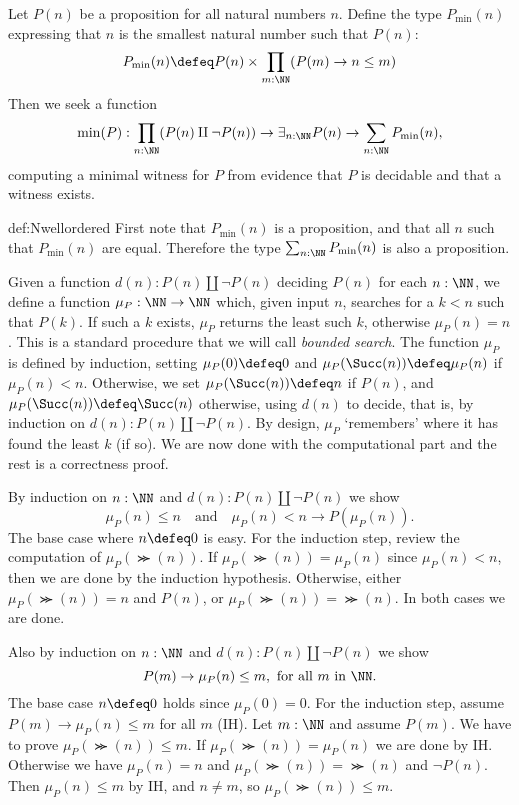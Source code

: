 \begin{construction}
\label{def:Nwellordered}
Let $P(n)$ be a proposition for all natural numbers $n$.
Define the type $P_{\min}(n)$ expressing that $n$ is the smallest
natural number such that $P(n)$:
\[
P_{\min}(n) \defeq P(n) \times \prod_{m:\NN} (P(m) \to n\leq m)
\]
Then we seek a function
\begin{equation}\label{eqn:min}
\min(P) : \prod_{n:\NN}(P(n)\amalg\neg P(n)) \to
          \exists_{n:\NN} P(n) \to \sum_{n:\NN} P_{\min}(n),
\end{equation}
computing a minimal witness for $P$
from evidence that $P$ is decidable and that a witness exists.
\end{construction}
\begin{implementation}{def:Nwellordered}
First note that $P_{\min}(n)$ is a proposition,
and that all $n$ such that $P_{\min}(n)$
are equal. Therefore the type $\sum_{n:\NN} P_{\min}(n)$
is also a proposition.

Given a function $d(n): P(n)\amalg\neg P(n)$ deciding $P(n)$ for each $n:\NN$,
we define a function $\mu_P:\NN\to\NN$ which,
given input $n$, searches for a $k<n$ such that $P(k)$.
If such a $k$ exists, $\mu_P$ returns the least such $k$,
otherwise $\mu_P(n) = n$.
This is a standard procedure that we will call \emph{bounded search}.
The function $\mu_P$ is defined by induction, setting
$\mu_P(0)\defeq 0$ and
$\mu_P(\Succ(n))\defeq \mu_P(n)$ if $\mu_P(n) < n$.
Otherwise, we set $\mu_P(\Succ(n))\defeq n$ if $P(n)$,
and $\mu_P(\Succ(n))\defeq \Succ(n)$ otherwise, using $d(n)$ to decide,
that is, by induction on $d(n):P(n)\amalg\neg P(n)$.
By design, $\mu_P$ `remembers' where it has found the least $k$ (if so).
We are now done with the computational part and the rest
is a correctness proof.

By induction on $n:\NN$ and $d(n): P(n)\amalg\neg P(n)$ we show
\[
\mu_P(n)\leq n \quad\text{and}\quad \mu_P(n)<n \to P(\mu_P(n)).
\]
The base case where $n \defeq 0$ is easy. For the induction step,
review the computation of $\mu_P(\Succ(n))$. If $\mu_P(\Succ(n)) = \mu_P(n)$
since $\mu_P(n) < n$, then we are done by the induction hypothesis.
Otherwise, either $\mu_P(\Succ(n)) = n$ and $P(n)$, or $\mu_P(\Succ(n)) = \Succ(n)$.
In both cases we are done.

Also by induction on $n:\NN$ and $d(n): P(n)\amalg\neg P(n)$ we show
\[
P(m) \to \mu_P(n)\leq m,~ \text{for all $m$ in $\NN$.}
\]
The base case $n \defeq 0$ holds since $\mu_P(0) = 0$. For the induction step,
assume $P(m) \to \mu_P(n)\leq m$ for all $m$ (IH). Let $m:\NN$
and assume $P(m)$. We have to prove $\mu_P(\Succ(n))\leq m$.
If $\mu_P(\Succ(n)) = \mu_P(n)$ we are done by IH. Otherwise we have
$\mu_P(n) = n$ and $\mu_P(\Succ(n)) = \Succ(n)$ and $\neg P(n)$.
Then $\mu_P(n)\leq m$ by IH, and $n\ne m$, so $\mu_P(\Succ(n))\leq m$.


\end{implementation}
